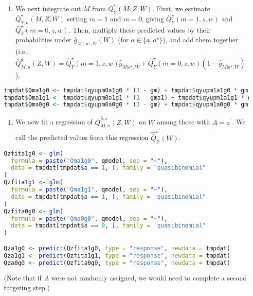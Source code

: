 \documentclass[
  12pt, krantz2,
]{book}
\providecommand{\tightlist}{%
  \setlength{\itemsep}{0pt}\setlength{\parskip}{0pt}}
\theoremstyle{definition}
\theoremstyle{definition}
\theoremstyle{definition}
\newcommand{\1}{\mathbbm{1}}
\begin{document}
\begin{enumerate}
\def\labelenumi{\arabic{enumi}.}
\setcounter{enumi}{7}
\tightlist
\item
  We next integrate out \(M\) from \(\bar{Q}^{\star}_{Y}(M,Z,W)\). First, we
  estimate \(\bar{Q}^{\star}_{Y,n}(M,Z,W)\) setting \(m=1\) and \(m=0\), giving
  \(\bar{Q}^{\star}_Y(m=1, z, w)\) and \(\bar{Q}^{\star}_Y(m=0, z, w)\). Then,
  multiply these predicted values by their probabilities under
  \(\hat{g}_{M \mid a^{\star},W}(W)\) (for \(a \in \{a, a^{\star}\}\)), and add
  them together (i.e., \(\bar{Q}^{\hat{g}}_{M,n}(Z,W) = \hat{Q}^{\star}_Y(m=1, z, w) \hat{g}_{M|a^{\star},W} + \hat{Q}^{\star}_Y(m=0, z, w)(1-\hat{g}_{M|a^{\star},W})\)).
\end{enumerate}

\begin{lstlisting}[language=R]
tmpdat$Qma1g0 <- tmpdat$qyupm0a1g0 * (1 - gm) + tmpdat$qyupm1a1g0 * gm
tmpdat$Qma1g1 <- tmpdat$qyupm0a1g1 * (1 - gma1) + tmpdat$qyupm1a1g1 * gma1
tmpdat$Qma0g0 <- tmpdat$qyupm0a0g0 * (1 - gm) + tmpdat$qyupm1a0g0 * gm
\end{lstlisting}

\begin{enumerate}
\def\labelenumi{\arabic{enumi}.}
\setcounter{enumi}{8}
\tightlist
\item
  We now fit a regression of \(\bar{Q}^{\hat{g},\star}_{M,n}(Z,W)\) on \(W\)
  among those with \(A=a^\prime\). We call the predicted values from this
  regression \(\hat{\bar{Q}}^{a^\prime}_{Z}(W)\).
\end{enumerate}

\begin{lstlisting}[language=R]
Qzfita1g0 <- glm(
  formula = paste("Qma1g0", qmodel, sep = "~"),
  data = tmpdat[tmpdat$a == 1, ], family = "quasibinomial"
)
Qzfita1g1 <- glm(
  formula = paste("Qma1g1", qmodel, sep = "~"),
  data = tmpdat[tmpdat$a == 1, ], family = "quasibinomial"
)
Qzfita0g0 <- glm(
  formula = paste("Qma0g0", qmodel, sep = "~"),
  data = tmpdat[tmpdat$a == 0, ], family = "quasibinomial"
)

Qza1g0 <- predict(Qzfita1g0, type = "response", newdata = tmpdat)
Qza1g1 <- predict(Qzfita1g1, type = "response", newdata = tmpdat)
Qza0g0 <- predict(Qzfita0g0, type = "response", newdata = tmpdat)
\end{lstlisting}

(Note that if \(A\) were not randomly assigned, we would need to complete a
second targeting step.)
\end{document}
